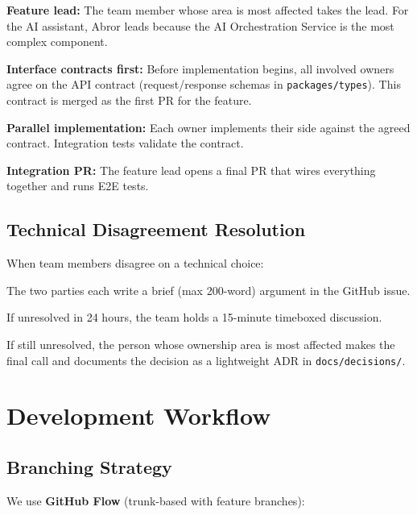 \documentclass[10pt, a4paper]{article}
\begin{document}
\begin{specenum}
\item \textbf{Feature lead:} The team member whose area is most affected takes the lead. For the AI assistant, Abror leads because the AI Orchestration Service is the most complex component.
\item \textbf{Interface contracts first:} Before implementation begins, all involved owners agree on the API contract (request/response schemas in \texttt{packages/types}). This contract is merged as the first PR for the feature.
\item \textbf{Parallel implementation:} Each owner implements their side against the agreed contract. Integration tests validate the contract.
\item \textbf{Integration PR:} The feature lead opens a final PR that wires everything together and runs E2E tests.
\end{specenum}

\subsection{Technical Disagreement Resolution}

When team members disagree on a technical choice:
\begin{specenum}
\item The two parties each write a brief (max 200-word) argument in the GitHub issue.
\item If unresolved in 24 hours, the team holds a 15-minute timeboxed discussion.
\item If still unresolved, the person whose ownership area is most affected makes the final call and documents the decision as a lightweight ADR in \texttt{docs/decisions/}.
\end{specenum}


\section{Development Workflow}

\subsection{Branching Strategy}

We use \textbf{GitHub Flow} (trunk-based with feature branches):
\end{document}
